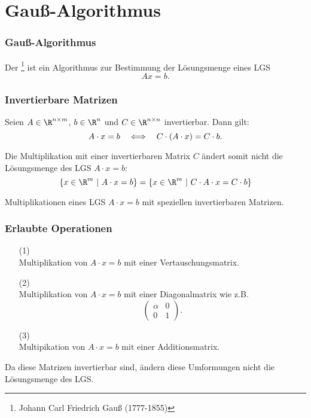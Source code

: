 \section{Gau{\ss}-Algorithmus}
\makeSectionDividerPage
%
\begin{frame}\frametitle{Gau{\ss}-Algorithmus} 

	Der \footnote{Johann Carl Friedrich Gau{\ss} (1777-1855)}
	ist ein Algorithmus zur Bestimmung der Lösungsmenge eines LGS
	$$
		Ax = b.
	$$
	
\end{frame}
%
%
\begin{frame}\frametitle{Invertierbare Matrizen}

	Seien $A\in\R^{n\times m}$, $b\in \R^n$ und $C\in \R^{n\times n}$ invertierbar. 
	Dann gilt:
	$$
		A\cdot x = b  \quad\Longleftrightarrow\quad C\cdot (A\cdot x) = C\cdot b. \vspace{5mm}
	$$

	\pause
	\vspace{5mm}
	Die Multiplikation mit einer invertierbaren Matrix $C$ ändert somit nicht die Lösungsmenge des LGS $A\cdot x=b$:
	$$
		\{ x \in \R^m ~|~ A\cdot x = b\}
		=
		\{ x \in \R^m ~|~ C\cdot A\cdot x = C\cdot b\}
	$$
	
	\pause
	\vspace{4mm}
	Multiplikationen eines LGS $A\cdot x = b$  mit speziellen invertierbaren Matrizen.

\end{frame}
%
%
\begin{frame}\frametitle{Erlaubte Operationen}

	\begin{itemize}
		\item[(1)] \\
			Multiplikation von $A\cdot x=b$ mit einer Vertauschungsmatrix. \pause
		\item[(2)] \\
			Multiplikation von $A\cdot x=b$ mit einer Diagonalmatrix wie z.B. $$\begin{pmatrix}\alpha & 0  \\ 0 & 1 \end{pmatrix}.$$ \pause
		\item[(3)] \\
			Multipikation von $A\cdot x=b$ mit einer Additionsmatrix. \pause
	\end{itemize}
	
	\vspace{3mm}
	Da diese Matrizen invertierbar sind, ändern diese Umformungen nicht die Lösungsmenge des LGS. 
	
\end{frame}
